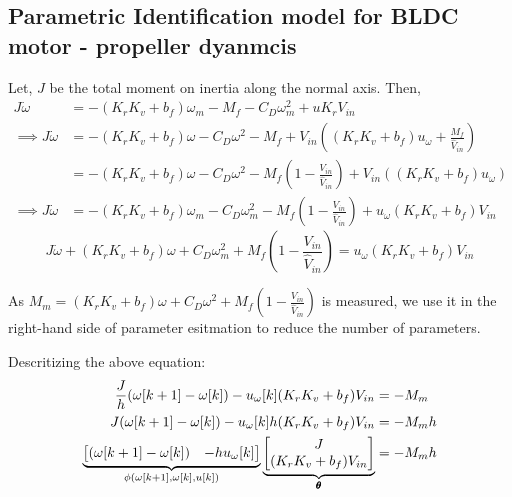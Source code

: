\subsection{Parametric Identification model for BLDC motor - propeller dyanmcis}
Let, $J$ be the total moment on inertia along the normal axis. Then,
\begin{align*}
    J \dot \omega &= -(K_rK_v + b_f) \omega_m - M_f - C_D \omega_m^2 + u K_r V_{in}\\
    \implies J\dot \omega &= -(K_rK_v + b_f) \omega - C_D \omega^2 - M_f + V_{in} \left((K_r K_v  + b_f) u_\omega + \frac{M_f}{\hat V_{in}} \right)\\
        &= -(K_rK_v + b_f) \omega - C_D \omega^2 - M_f \left( 1 - \frac{V_{in}}{\hat V_{in}}\right) + V_{in} \left((K_r K_v  + b_f) u_\omega  \right)\\
    \implies J \dot \omega &= -(K_rK_v + b_f)\omega_m - C_D \omega_m^2 - M_f \left( 1 - \frac{V_{in}}{\hat V_{in}}\right) + u_\omega (K_rK_v + b_f) V_{in}
\end{align*}
$$\boxed{J \dot \omega + (K_rK_v + b_f)\omega + C_D \omega_m^2 + M_f \left( 1 - \frac{V_{in}}{\hat V_{in}}\right) =  u_\omega (K_rK_v + b_f) V_{in}}$$

As $M_m = (K_rK_v + b_f) \omega + C_D \omega^2 + M_f \left( 1 - \frac{V_{in}}{\hat V_{in}}\right) $ is measured, we use it in the right-hand side of parameter esitmation to reduce the number of parameters.

Descritizing the above equation:
\begin{align*}
    \frac{J}{h} (\omega[k+1] - \omega[k]) - u_\omega[k] (K_rK_v + b_f) V_{in} &= - M_m \\
    J(\omega[k+1] - \omega[k]) - u_\omega[k] h(K_rK_v + b_f) V_{in} &= - M_m h \\
    \underbrace{\begin{bmatrix} (\omega[k+1] - \omega[k]) & -h u_\omega[k] \end{bmatrix} }_{\phi(\omega[k+1], \omega[k], u[k])} \underbrace{\begin{bmatrix} J \\ (K_rK_v + b_f) V_{in}  \end{bmatrix}}_{\pmb \theta} &= - M_m h
\end{align*}




